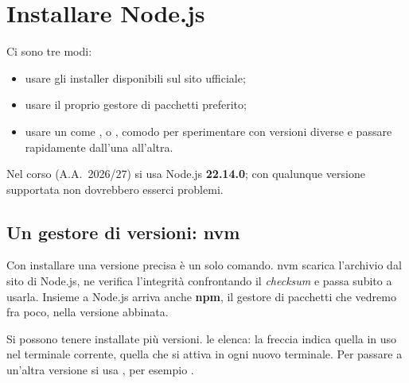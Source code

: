 \section{Installare Node.js}

Ci sono tre modi:

\begin{itemize}
  \item usare gli installer disponibili sul sito ufficiale;
  \item usare il proprio gestore di pacchetti preferito;
  \item usare un  come ,  o
        , comodo per sperimentare con versioni diverse e passare
        rapidamente dall'una all'altra.
\end{itemize}

Nel corso (A.A.\ 2026/27) si usa Node.js \textbf{22.14.0}; con qualunque
versione supportata non dovrebbero esserci problemi.

\subsection{Un gestore di versioni: nvm}

Con  installare una versione precisa è un solo comando. nvm scarica
l'archivio dal sito di Node.js, ne verifica l'integrità confrontando il
\textit{checksum} e passa subito a usarla. Insieme a Node.js arriva anche
\textbf{npm}, il gestore di pacchetti che vedremo fra poco, nella versione
abbinata.


Si possono tenere installate più versioni.  le elenca: la
freccia indica quella in uso nel terminale corrente,  quella che
si attiva in ogni nuovo terminale. Per passare a un'altra versione si usa
, per esempio .

